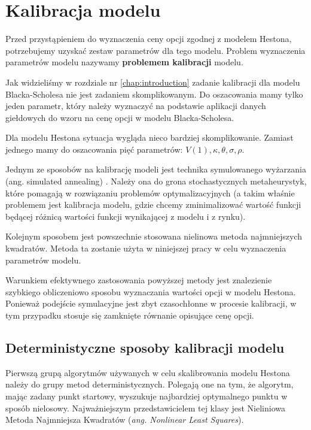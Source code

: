 \documentclass{pracamgr}
\begin{document}
\chapter{Kalibracja modelu}
\label{chap:chapterModelCalibration}



Przed przystąpieniem do wyznaczenia ceny opcji zgodnej z modelem Hestona, potrzebujemy uzyskać zestaw parametrów dla 
tego modelu. Problem wyznaczenia parametrów modelu nazywamy \textbf{problemem kalibracji} modelu.  

Jak widzieliśmy w rozdziale nr \ref{chap:introduction} zadanie kalibracji dla modelu Blacka-Scholesa nie jest 
zadaniem skomplikowanym. Do oszacowania mamy tylko jeden parametr, który należy wyznaczyć na podstawie aplikacji 
danych giełdowych do wzoru na cenę opcji w modelu Blacka-Scholesa.

Dla modelu Hestona sytuacja wygląda nieco bardziej skomplikowanie. Zamiast jednego mamy do oszacowania pięć parametrów:
$V(1),\kappa, \theta, \sigma, \rho$.  



Jednym ze sposobów na kalibrację modeli jest technika symulowanego wyżarzania (ang. simulated annealing)
. Należy ona do 
grona stochastycznych metaheurystyk,  które pomagają w rozwiązaniu problemów optymalizacyjnych (a takim właśnie problemem 
jest kalibracja modelu, gdzie chcemy zminimalizować wartość funkcji będącej różnicą wartości funkcji wynikającej z 
modelu i z rynku).

Kolejnym sposobem jest powszechnie stosowana nielinowa metoda najmniejszych kwadratów. Metoda ta zostanie użyta w niniejszej pracy w celu wyznaczenia parametrów modelu.

Warunkiem efektywnego zastosowania powyższej metody jest znalezienie szybkiego obliczeniowo sposobu wyznaczania wartości opcji w 
modelu Hestona. Ponieważ podejście symulacyjne jest zbyt czasochłonne w procesie kalibracji, w tym przypadku stosuje 
się zamknięte równanie opisujące cenę opcji.


\section{Deterministyczne sposoby kalibracji modelu} 
Pierwszą grupą algorytmów używanych w celu skalibrowania modelu Hestona należy do grupy metod deterministycznych.
Polegają one na tym, że algorytm, mając zadany punkt startowy, wyszukuje najbardziej optymalnego punktu w sposób nielosowy.
Najważniejszym przedstawicielem tej klasy jest Nieliniowa Metoda Najmniejsza Kwadratów (\textit{ang. Nonlinear Least Squares}).
\end{document}
